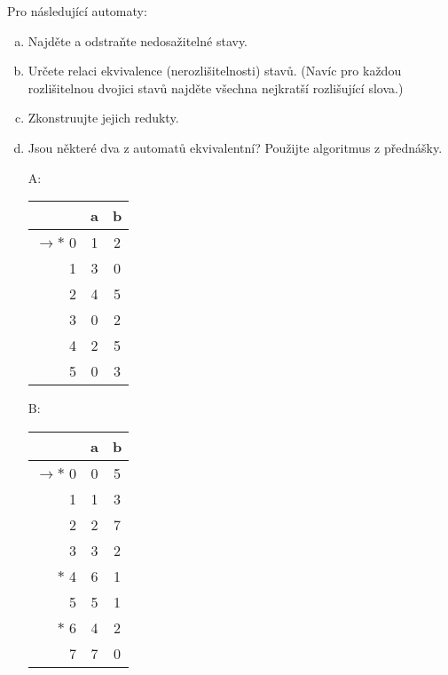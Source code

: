 \documentclass[a4paper,12pt]{amsart}
\begin{document}
\begin{problem}    
    
    Pro následující automaty:

    \begin{enumerate}[(a)]\setlength\itemsep{12pt}
        \item Najděte a odstraňte nedosažitelné stavy.
        \item Určete relaci ekvivalence (nerozlišitelnosti) stavů. (Navíc pro každou rozlišitelnou dvojici stavů najděte všechna nejkratší rozlišující slova.)
        \item Zkonstruujte jejich redukty.
        \item Jsou některé dva z automatů ekvivalentní? Použijte algoritmus z přednášky.
    \end{enumerate}
    
    \begin{multicols}{3}\small
    
        \begin{itemize}
            
            \item[A:] \bigskip
            \begin{tabular}{ r | c c }
            & a & b \\ \hline
            $\to\ast$ 0 & 1 & 2 \\  
            1 & 3 & 0 \\
            2 & 4 & 5 \\
            3 & 0 & 2 \\
            4 & 2 & 5 \\
            5 & 0 & 3
            \end{tabular}
            
            \item[B:] \begin{tabular}{ r | c c }
            & a & b \\ \hline
            $\to\ast$ 0 & 0 & 5 \\  
            1 & 1 & 3 \\
            2 & 2 & 7 \\
            3 & 3 & 2 \\
            $\ast$ 4 & 6 & 1 \\
            5 & 5 & 1 \\
            $\ast$ 6 & 4 & 2 \\
            7 & 7 & 0
            \end{tabular}
                

\end{itemize}
\end{multicols}
\end{problem}
\end{document}
